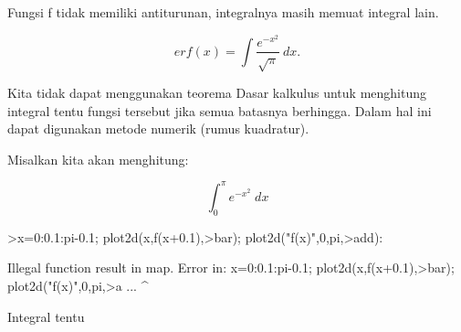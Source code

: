 \documentclass[a4paper,10pt]{article}
\begin{document}
\begin{eulernotebook}
\begin{eulercomment}
\begin{eulercomment}
\begin{eulercomment}
\begin{eulercomment}
\begin{eulercomment}
\begin{eulercomment}
\begin{eulercomment}
\begin{eulercomment}
\begin{eulercomment}
\begin{eulercomment}
\begin{eulercomment}
\begin{eulercomment}
\begin{eulercomment}
\begin{eulercomment}
\begin{eulercomment}
\begin{eulercomment}
\begin{eulercomment}
\begin{eulercomment}
\begin{eulercomment}
\begin{eulercomment}
\begin{eulercomment}
\begin{eulercomment}
\begin{eulercomment}
\begin{eulercomment}
\begin{eulercomment}
\begin{eulercomment}
\begin{eulercomment}
\begin{eulercomment}
\begin{euleroutput}
\end{euleroutput}
\begin{eulercomment}
Fungsi f tidak memiliki antiturunan, integralnya masih memuat integral
lain.

\end{eulercomment}
\begin{eulerformula}
\[
erf(x) = \int \frac{e^{-x^2}}{\sqrt{\pi}} \ dx.
\]
\end{eulerformula}
\begin{eulercomment}
Kita tidak dapat menggunakan teorema Dasar kalkulus untuk menghitung
integral tentu fungsi tersebut jika semua batasnya berhingga. Dalam
hal ini dapat digunakan metode numerik (rumus kuadratur).

Misalkan kita akan menghitung:

\end{eulercomment}
\begin{eulerformula}
\[
\int_{0}^{\pi}{e^ {- x^2 }\;dx}
\]
\end{eulerformula}
\begin{eulerprompt}
>x=0:0.1:pi-0.1; plot2d(x,f(x+0.1),>bar); plot2d("f(x)",0,pi,>add):
\end{eulerprompt}
\begin{euleroutput}
  Illegal function result in map.
  Error in:
  x=0:0.1:pi-0.1; plot2d(x,f(x+0.1),>bar); plot2d("f(x)",0,pi,>a ...
                                   ^
\end{euleroutput}
\begin{eulercomment}
Integral tentu


\end{eulercomment}
\end{eulercomment}
\end{eulercomment}
\end{eulercomment}
\end{eulercomment}
\end{eulercomment}
\end{eulercomment}
\end{eulercomment}
\end{eulercomment}
\end{eulercomment}
\end{eulercomment}
\end{eulercomment}
\end{eulercomment}
\end{eulercomment}
\end{eulercomment}
\end{eulercomment}
\end{eulercomment}
\end{eulercomment}
\end{eulercomment}
\end{eulercomment}
\end{eulercomment}
\end{eulercomment}
\end{eulercomment}
\end{eulercomment}
\end{eulercomment}
\end{eulercomment}
\end{eulercomment}
\end{eulercomment}
\end{eulercomment}
\end{eulernotebook}
\end{document}
